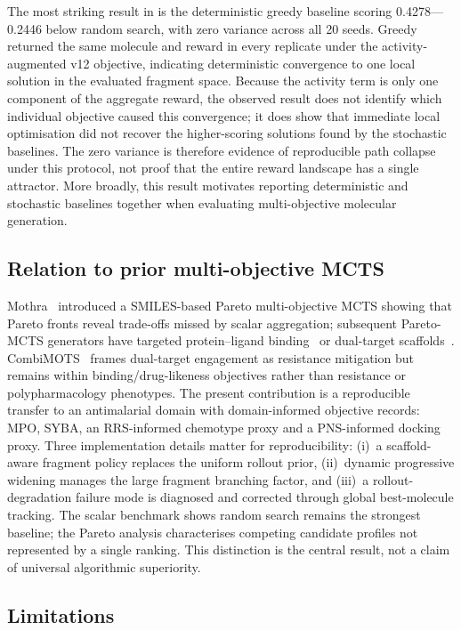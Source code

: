 \documentclass[10pt,a4paper]{article}
\begin{document}
The most striking result in  is the deterministic greedy baseline scoring \num{0.4278}---\num{0.2446} below random search, with zero variance across all \num{20} seeds. Greedy returned the same molecule and reward in every replicate under the activity-augmented v12 objective, indicating deterministic convergence to one local solution in the evaluated fragment space. Because the activity term is only one component of the aggregate reward, the observed result does not identify which individual objective caused this convergence; it does show that immediate local optimisation did not recover the higher-scoring solutions found by the stochastic baselines. The zero variance is therefore evidence of reproducible path collapse under this protocol, not proof that the entire reward landscape has a single attractor. More broadly, this result motivates reporting deterministic and stochastic baselines together when evaluating multi-objective molecular generation.

\subsection{Relation to prior multi-objective MCTS}

Mothra~\citep{Mothra2024} introduced a SMILES-based Pareto multi-objective MCTS showing that Pareto fronts reveal trade-offs missed by scalar aggregation; subsequent Pareto-MCTS generators have targeted protein--ligand binding~\citep{ParetoDrug2024} or dual-target scaffolds~\citep{CombiMOTS2026}. CombiMOTS~\citep{CombiMOTS2026} frames dual-target engagement as resistance mitigation but remains within binding/drug-likeness objectives rather than resistance or polypharmacology phenotypes. The present contribution is a reproducible transfer to an antimalarial domain with domain-informed objective records: MPO, SYBA, an RRS-informed chemotype proxy and a PNS-informed docking proxy. Three implementation details matter for reproducibility: (i)~a scaffold-aware fragment policy replaces the uniform rollout prior, (ii)~dynamic progressive widening manages the large fragment branching factor, and (iii)~a rollout-degradation failure mode is diagnosed and corrected through global best-molecule tracking. The scalar benchmark shows random search remains the strongest baseline; the Pareto analysis characterises competing candidate profiles not represented by a single ranking. This distinction is the central result, not a claim of universal algorithmic superiority.

\subsection{Limitations}
\end{document}

